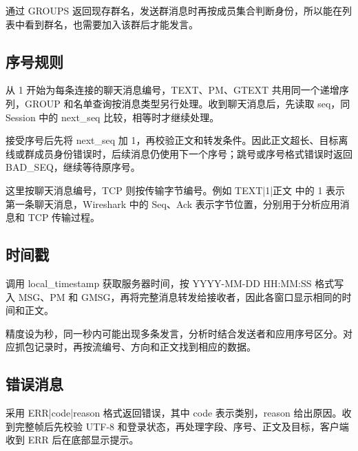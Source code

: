 \documentclass[UTF8,a4paper,10pt,fontset=fandol]{ctexart}
\begin{document}
通过 GROUPS 返回现存群名，发送群消息时再按成员集合判断身份，所以能在列表中看到群名，也需要加入该群后才能发言。

\subsection{序号规则}
从 1 开始为每条连接的聊天消息编号，TEXT、PM、GTEXT 共用同一个递增序列，GROUP 和名单查询按消息类型另行处理。收到聊天消息后，先读取 seq，同 Session 中的 next\_seq 比较，相等时才继续处理。

接受序号后先将 next\_seq 加 1，再校验正文和转发条件。因此正文超长、目标离线或群成员身份错误时，后续消息仍使用下一个序号；跳号或序号格式错误时返回 BAD\_SEQ，继续等待原序号。

这里按聊天消息编号，TCP 则按传输字节编号。例如 TEXT|\allowbreak{}1|\allowbreak{}正文 中的 1 表示第一条聊天消息，Wireshark 中的 Seq、Ack 表示字节位置，分别用于分析应用消息和 TCP 传输过程。

\subsection{时间戳}
调用 local\_timestamp 获取服务器时间，按 YYYY-MM-DD HH:MM:SS 格式写入 MSG、PM 和 GMSG，再将完整消息转发给接收者，因此各窗口显示相同的时间和正文。

精度设为秒，同一秒内可能出现多条发言，分析时结合发送者和应用序号区分。对应抓包记录时，再按流编号、方向和正文找到相应的数据。

\subsection{错误消息}
采用 ERR|\allowbreak{}code|\allowbreak{}reason 格式返回错误，其中 code 表示类别，reason 给出原因。收到完整帧后先校验 UTF-8 和登录状态，再处理字段、序号、正文及目标，客户端收到 ERR 后在底部显示提示。
\end{document}
